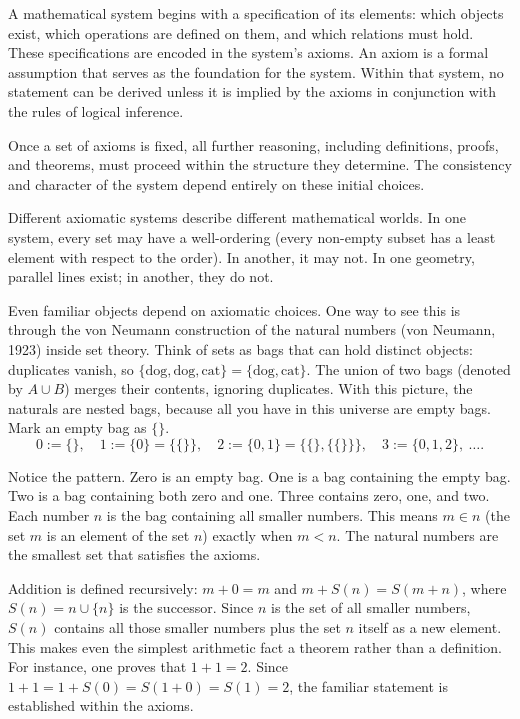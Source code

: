A mathematical system begins with a specification of its elements: which objects exist, which operations are defined on them, and which relations must hold. These specifications are encoded in the system's axioms. An axiom is a formal assumption that serves as the foundation for the system. Within that system, no statement can be derived unless it is implied by the axioms in conjunction with the rules of logical inference.

Once a set of axioms is fixed, all further reasoning, including definitions, proofs, and theorems, must proceed within the structure they determine. The consistency and character of the system depend entirely on these initial choices.

Different axiomatic systems describe different mathematical worlds. In one system, every set may have a well-ordering (every non-empty subset has a least element with respect to the order). In another, it may not. In one geometry, parallel lines exist; in another, they do not.

Even familiar objects depend on axiomatic choices. One way to see this is through the von Neumann construction of the natural numbers (von Neumann, 1923) inside set theory. Think of sets as \QSOpen{}bags\QSClose{} that can hold distinct objects: duplicates vanish, so $\{\text{dog},\text{dog},\text{cat}\}=\{\text{dog},\text{cat}\}$. The union of two bags (denoted by $A \cup B$) merges their contents, ignoring duplicates. With this picture, the naturals are nested bags, because all you have in this universe are empty bags. Mark an empty bag as $\{ \}$. 
\[
0:=\{\}, \quad 1:=\{0\}=\{\{\}\}, \quad 2:=\{0,1\}=\{\{\},\{\{\}\}\}, \quad 3:=\{0,1,2\}, \ \dots.
\]

Notice the pattern. Zero is an empty bag. One is a bag containing the empty bag. Two is a bag containing both zero and one. Three contains zero, one, and two. Each number $n$ is the bag containing all smaller numbers. This means $m\in n$ (the set $m$ is an element of the set $n$) exactly when $m<n$. The natural numbers are the smallest set that satisfies the axioms.

Addition is defined recursively: $m+0=m$ and $m+S(n)=S(m+n)$, where $S(n)=n\cup\{n\}$ is the successor. Since $n$ is the set of all smaller numbers, $S(n)$ contains all those smaller numbers plus the set $n$ itself as a new element. This makes even the simplest arithmetic fact a theorem rather than a definition. For instance, one proves that $1+1=2$. Since $1+1=1+S(0)=S(1+0)=S(1)=2$, the familiar statement is established within the axioms.


